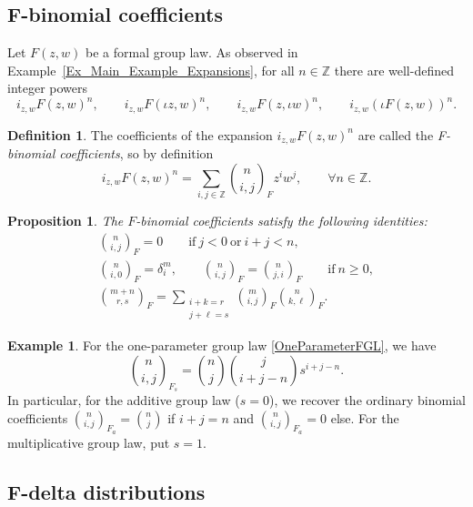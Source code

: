 \documentclass[10pt,a4paper]{amsart}
\numberwithin{equation}{section}
\newtheorem{Proposition}[Theorem]{Proposition}
\theoremstyle{definition}
\newtheorem{Definition}[Theorem]{Definition}
\newtheorem{Example}[Theorem]{Example}
\newcommand\Fbinom[2]{\binom{#1}{#2}_{\!\!F}}
\begin{document}
\subsection[F-binomial coefficient]{$\boldsymbol{F}$-binomial coefficients}\label{s35}

Let $F(z,w)$ be a formal group law. As observed in Example~\ref{Ex_Main_Example_Expansions}, for all $n\in\mathbb{Z}$ there are well-defined integer powers
\[
 i_{z,w}F(z,w)^n,\qquad i_{z,w}F(\iota z,w)^n,\qquad i_{z,w}F(z,\iota w)^n,\qquad i_{z,w}(\iota F(z,w))^n.
\]

\begin{Definition}
The coefficients of the expansion $i_{z,w}F(z,w)^n$ are called the \emph{F-binomial coefficients}, so by definition
\begin{equation}
\label{def-F-binom}
 i_{z,w}F(z,w)^n=\sum_{i,j\in\mathbb{Z}}\Fbinom{n}{i,j} z^iw^j,\qquad\forall n\in\mathbb{Z}.
\end{equation}
\end{Definition}

\begin{Proposition}
The $F$-binomial coefficients satisfy the following identities:
\begin{gather*}%
 \Fbinom{n}{i,j}=0
 \qquad\text{if} \ j<0 \ \text{or} \ i+j<n,\\
 \Fbinom{n}{i,0}=\delta_i^m,\qquad
\Fbinom{n}{i,j}=\Fbinom{n}{j,i}
\qquad\text{if}\ n\geqslant0,\\
 \Fbinom{m+n}{r,s}=\sum_{\substack{i+k=r\\j+\ell=s}} \Fbinom{m}{i,j}\Fbinom{n}{k,\ell}.
\end{gather*}
\end{Proposition}

\begin{Example}
For the one-parameter group law \eqref{OneParameterFGL}, we have
\[
 \binom{n}{i,j}_{\!\!F_s}=\binom{n}{j}\binom{j}{i+j-n}s^{i+j-n}.
\]
In particular, for the additive group law ($s=0$), we recover the ordinary binomial coefficients $\binom{n}{i,j}_{\!\!F_a}=\binom{n}{j}$ if $i+j=n$ and $\binom{n}{i,j}_{\!\!F_a}=0$ else. For the multiplicative group law, put $s=1$.%
\end{Example}

\subsection[F-delta distributions]{$\boldsymbol{F}$-delta distributions}
\label{s36}
\end{document}
